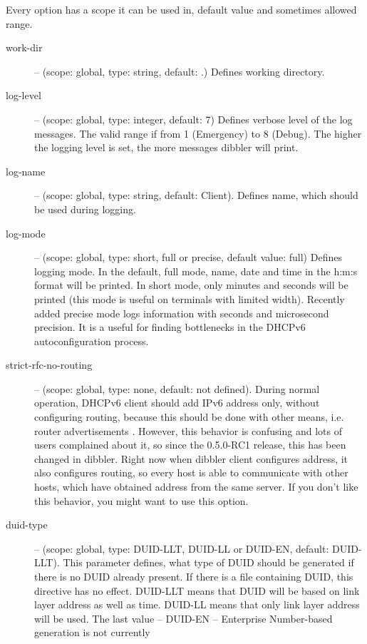 Every option has a scope it can be used in, default value and
sometimes allowed range. 

\begin{description}
 \item[work-dir] -- (scope: global, type: string, default: .) Defines working
	    directory.
 \item[log-level] -- (scope: global, type: integer, default: 7) Defines
	    verbose level of the log messages. The valid range if
	    from 1 (Emergency) to 8 (Debug). The higher the logging
	    level is set, the more messages dibbler will print.
 \item[log-name] -- (scope: global, type: string, default: Client). Defines 
	    name, which should be used during logging.
 \item[log-mode] -- (scope: global, type: short, full or precise,
	    default value: full) Defines logging mode. In the
	    default, full mode, name, date and time in the h:m:s format
	    will be printed. In short mode, only minutes and
	    seconds will be printed (this mode is useful on
	    terminals with limited width). Recently added precise
	    mode logs information with seconds and microsecond
	    precision. It is a useful for finding bottlenecks in
	    the DHCPv6 autoconfiguration process.
 \item[strict-rfc-no-routing] -- (scope: global, type: none, default:
	    not defined). During normal operation, DHCPv6 client
	    should add IPv6 address only, without configuring
	    routing, because this should be done with other means,
	    i.e. router advertisements \cite{rfc2461}. However,
	    this behavior is confusing and lots of users complained
	    about it, so since the 0.5.0-RC1 release, this has been changed
	    in dibbler. Right now when dibbler client configures
	    address, it also configures routing, so every host is
	    able to communicate with other hosts, which have
	    obtained address from the same server. If you don't
	    like this behavior, you might want to use this option.
 \item[duid-type] -- (scope: global, type: DUID-LLT, DUID-LL or DUID-EN,
	    default: DUID-LLT). This parameter defines, what type of
	    DUID should be generated if there is no DUID already
	    present. If there is a file containing DUID, this directive
	    has no effect. DUID-LLT means that DUID will be based on
	    link layer address as well as time. DUID-LL means that only
	    link layer address will be used. The last value -- DUID-EN
	    -- Enterprise Number-based generation is not currently

\end{description}
